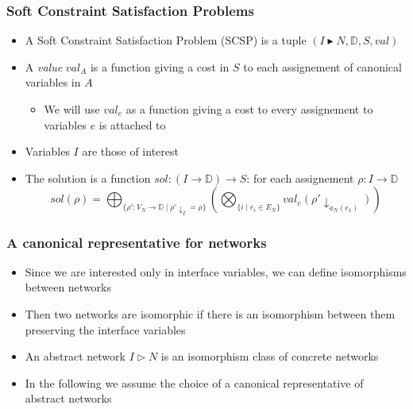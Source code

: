 \documentclass{beamer}
\begin{document}
\begin{frame}
\frametitle{Soft Constraint Satisfaction Problems}
\begin{itemize}
	\item A Soft Constraint Satisfaction Problem (SCSP) is a tuple 
	$(I \blacktriangleright N, \mathbb{D}, S, val)$
\medskip
	\item A \emph{value} $val_A$ is a function giving a cost in $S$ to each assignement of 
	canonical variables in $A$
	\begin{itemize}
		\item We will use $val_e$ as a function giving a cost to every assignement to variables
		$e$ is attached to
	\end{itemize}
\medskip
	\item Variables $I$ are those of interest
\medskip
	\item The solution is a function $sol: (I \rightarrow \mathbb{D}) \rightarrow S$: for each
	assignement $\rho: I \rightarrow \mathbb{D}$
	    \[ sol(\rho) = \bigoplus_{\{ \rho': V_N \rightarrow \mathbb{D} \mid 
		\rho' \downarrow_I = \rho \}} (\bigotimes_{\{i \mid e_i \in E_N \}}val_e(\rho' 
		\downarrow_{a_N(e_1)})) \]
\end{itemize}
\end{frame}

\begin{frame}
\frametitle{A canonical representative for networks}
\begin{itemize}
	\item Since we are interested only in interface variables, we can define isomorphisms
	between networks
		\item Then two networks are isomorphic if there is an isomorphism between them
		preserving the interface variables
		\item An abstract network $I \triangleright N$ is an isomorphism class of concrete
		networks
		\item In the following we assume the choice of a canonical representative of abstract
		networks
\end{itemize}
\end{frame}
\end{document}
